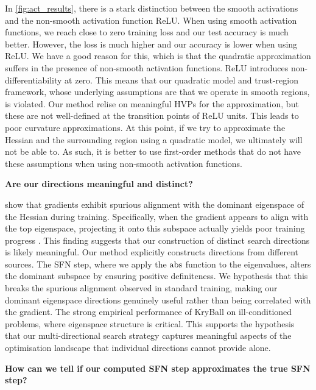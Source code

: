 In \cref{fig:act_results}, there is a stark distinction between the smooth activations and the non-smooth activation function ReLU. When using smooth activation functions, we reach close to zero training loss and our test accuracy is much better. However, the loss is much higher and our accuracy is lower when using ReLU. We have a good reason for this, which is that the quadratic approximation suffers in the presence of non-smooth activation functions. ReLU introduces non-differentiability at zero. This means that our quadratic model and trust-region framework, whose underlying assumptions are that we operate in smooth regions, is violated. Our method relise on meaningful HVPs for the approximation, but these are not well-defined at the transition points of ReLU units. This leads to poor curvature approximations. At this point, if we try to approximate the Hessian and the surrounding region using a quadratic model, we ultimately will not be able to. As such, it is better to use first-order methods that do not have these assumptions when using non-smooth activation functions. 

\textbf{Are our directions meaningful and distinct?}

\cite{tinysubspaces} show that gradients exhibit spurious alignment with the dominant eigenspace of the Hessian during training. Specifically, when the gradient appears to align with the top eigenspace, projecting it onto this subspace actually yields poor training progress \cite{tinysubspaces}. This finding suggests that our construction of distinct search directions is likely meaningful. Our method explicitly constructs directions from different sources. The SFN step, where we apply the $\operatorname{abs}$ function to the eigenvalues, alters the dominant subspace by ensuring positive definiteness. We hypothesis that this breaks the spurious alignment observed in standard training, making our dominant eigenspace directions genuinely useful rather than being correlated with the gradient. The strong empirical performance of KryBall on ill-conditioned problems, where eigenspace structure is critical. This supports the hypothesis that our multi-directional search strategy captures meaningful aspects of the optimisation landscape that individual directions cannot provide alone.

\textbf{How can we tell if our computed SFN step approximates the true SFN step?}

